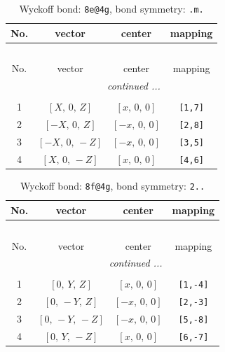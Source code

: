 \documentclass[fleqn,8pt]{jsarticle}
\begin{document}
\renewcommand{\arraystretch}{1.2}
\begin{longtable}{cccc}
\caption{Wyckoff bond: {\tt 8e@4g}, bond symmetry: {\tt .m.}}
 \\
 \hline \hline
No. & vector & center & mapping \\ \hline \endfirsthead

\multicolumn{3}{l}{\tablename\ \thetable{}} \\
 \hline \hline
No. & vector & center & mapping \\ \hline \endhead

 \hline \hline
\multicolumn{3}{r}{\footnotesize\it continued ...} \\ \endfoot

 \hline \hline
\multicolumn{3}{r}{} \\ \endlastfoot

1 & $\left[ X,\, 0,\, Z \right]$ & $\left[ x,\, 0,\, 0 \right]$ & {\tt [1,7]} \\ \hline
2 & $\left[ - X,\, 0,\, Z \right]$ & $\left[ - x,\, 0,\, 0 \right]$ & {\tt [2,8]} \\ \hline
3 & $\left[ - X,\, 0,\, - Z \right]$ & $\left[ - x,\, 0,\, 0 \right]$ & {\tt [3,5]} \\ \hline
4 & $\left[ X,\, 0,\, - Z \right]$ & $\left[ x,\, 0,\, 0 \right]$ & {\tt [4,6]} \\
\end{longtable}
\renewcommand{\arraystretch}{1.2}
\begin{longtable}{cccc}
\caption{Wyckoff bond: {\tt 8f@4g}, bond symmetry: {\tt 2..}}
 \\
 \hline \hline
No. & vector & center & mapping \\ \hline \endfirsthead

\multicolumn{3}{l}{\tablename\ \thetable{}} \\
 \hline \hline
No. & vector & center & mapping \\ \hline \endhead

 \hline \hline
\multicolumn{3}{r}{\footnotesize\it continued ...} \\ \endfoot

 \hline \hline
\multicolumn{3}{r}{} \\ \endlastfoot

1 & $\left[ 0,\, Y,\, Z \right]$ & $\left[ x,\, 0,\, 0 \right]$ & {\tt [1,-4]} \\ \hline
2 & $\left[ 0,\, - Y,\, Z \right]$ & $\left[ - x,\, 0,\, 0 \right]$ & {\tt [2,-3]} \\ \hline
3 & $\left[ 0,\, - Y,\, - Z \right]$ & $\left[ - x,\, 0,\, 0 \right]$ & {\tt [5,-8]} \\ \hline
4 & $\left[ 0,\, Y,\, - Z \right]$ & $\left[ x,\, 0,\, 0 \right]$ & {\tt [6,-7]} \\
\end{longtable}
\end{document}
